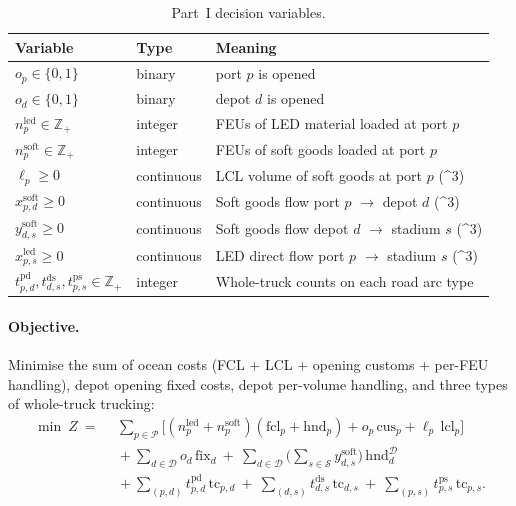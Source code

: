 \documentclass[11pt,a4paper]{article}
\numberwithin{equation}{section}
\newcommand{\mcube}{\text{m}^{3}}
\begin{document}
\begin{table}[h]
\centering
\small
\caption{Part~I decision variables.}
\label{tab:partI-vars}
\begin{tabular}{@{}l l l@{}}
\toprule
\textbf{Variable} & \textbf{Type} & \textbf{Meaning} \\
\midrule
$o_p \in \{0,1\}$        & binary     & port $p$ is opened \\
$o_d \in \{0,1\}$        & binary     & depot $d$ is opened \\
$n^{\mathrm{led}}_p \in \mathbb{Z}_+$ & integer & FEUs of LED material loaded at port $p$ \\
$n^{\mathrm{soft}}_p \in \mathbb{Z}_+$ & integer & FEUs of soft goods loaded at port $p$ \\
$\ell_p \ge 0$            & continuous & LCL volume of soft goods at port $p$ (\mcube) \\
$x^{\mathrm{soft}}_{p,d} \ge 0$ & continuous & Soft goods flow port $p$ $\to$ depot $d$ (\mcube) \\
$y^{\mathrm{soft}}_{d,s} \ge 0$ & continuous & Soft goods flow depot $d$ $\to$ stadium $s$ (\mcube) \\
$x^{\mathrm{led}}_{p,s} \ge 0$ & continuous & LED direct flow port $p$ $\to$ stadium $s$ (\mcube) \\
$t^{\mathrm{pd}}_{p,d}, t^{\mathrm{ds}}_{d,s}, t^{\mathrm{ps}}_{p,s} \in \mathbb{Z}_+$ & integer & Whole-truck counts on each road arc type \\
\bottomrule
\end{tabular}
\end{table}

\paragraph{Objective.} Minimise the sum of ocean costs (FCL + LCL + opening customs + per-FEU handling), depot opening fixed costs, depot per-volume handling, and three types of whole-truck trucking:
\begin{align}
\min\ Z\ =\ &\ \sum_{p\in\mathcal{P}} \!\Big[(n^{\mathrm{led}}_p + n^{\mathrm{soft}}_p)(\mathrm{fcl}_p + \mathrm{hnd}_p) + o_p\, \mathrm{cus}_p + \ell_p\, \mathrm{lcl}_p\Big]\nonumber\\
&\ + \sum_{d\in\mathcal{D}} o_d\, \mathrm{fix}_d
\ +\ \sum_{d\in\mathcal{D}}\!\Big(\sum_{s\in\mathcal{S}} y^{\mathrm{soft}}_{d,s}\Big)\, \mathrm{hnd}^{\mathcal{D}}_d\nonumber\\
&\ + \sum_{(p,d)} t^{\mathrm{pd}}_{p,d}\, \mathrm{tc}_{p,d}
\ +\ \sum_{(d,s)} t^{\mathrm{ds}}_{d,s}\, \mathrm{tc}_{d,s}
\ +\ \sum_{(p,s)} t^{\mathrm{ps}}_{p,s}\, \mathrm{tc}_{p,s}.\label{eq:partI-obj}
\end{align}
\end{document}
